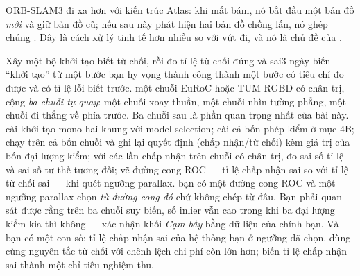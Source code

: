 \documentclass[../../vslam.tex]{subfiles}
\begin{document}
ORB-SLAM3 đi xa hơn với kiến trúc Atlas: khi mất bám, nó bắt đầu một bản đồ \emph{mới} và giữ bản đồ cũ; nếu sau này phát hiện hai bản đồ chồng lấn, nó ghép chúng \cite{campos2021orbslam3}. Đây là cách xử lý tinh tế hơn nhiều so với vứt đi, và nó là chủ đề của .

\begin{ungdung}
\end{ungdung}

\begin{duan}{Xây một bộ khởi tạo biết từ chối, rồi đo tỉ lệ từ chối đúng và sai}{3 ngày}
\dmt biến ``khởi tạo'' từ một bước bạn hy vọng thành công thành một bước có tiêu chí đo được và có tỉ lệ lỗi biết trước.
\ddl một chuỗi EuRoC hoặc TUM-RGBD có chân trị, cộng \emph{ba chuỗi tự quay}: một chuỗi xoay thuần, một chuỗi nhìn tường phẳng, một chuỗi đi thẳng về phía trước. Ba chuỗi sau là phần quan trọng nhất của bài này.
\dbc cài khởi tạo mono hai khung với model selection; cài cả bốn phép kiểm ở mục 4B; chạy trên cả bốn chuỗi và ghi lại quyết định (chấp nhận/từ chối) kèm giá trị của bốn đại lượng kiểm; với các lần chấp nhận trên chuỗi có chân trị, đo sai số tỉ lệ và sai số tư thế tương đối; vẽ đường cong ROC --- tỉ lệ chấp nhận sai so với tỉ lệ từ chối sai --- khi quét ngưỡng parallax.
\dxk bạn có một đường cong ROC và một ngưỡng parallax chọn \emph{từ đường cong đó} chứ không chép từ đâu. Bạn phải quan sát được rằng trên ba chuỗi suy biến, số inlier vẫn cao trong khi ba đại lượng kiểm kia thì không --- xác nhận khối \emph{Cạm bẫy} bằng dữ liệu của chính bạn. Và bạn có một con số: tỉ lệ chấp nhận sai của hệ thống bạn ở ngưỡng đã chọn.
\dnv {} dùng cùng nguyên tắc từ chối với chênh lệch chi phí còn lớn hơn;  biến tỉ lệ chấp nhận sai thành một chỉ tiêu nghiệm thu.
\end{duan}
\end{document}
